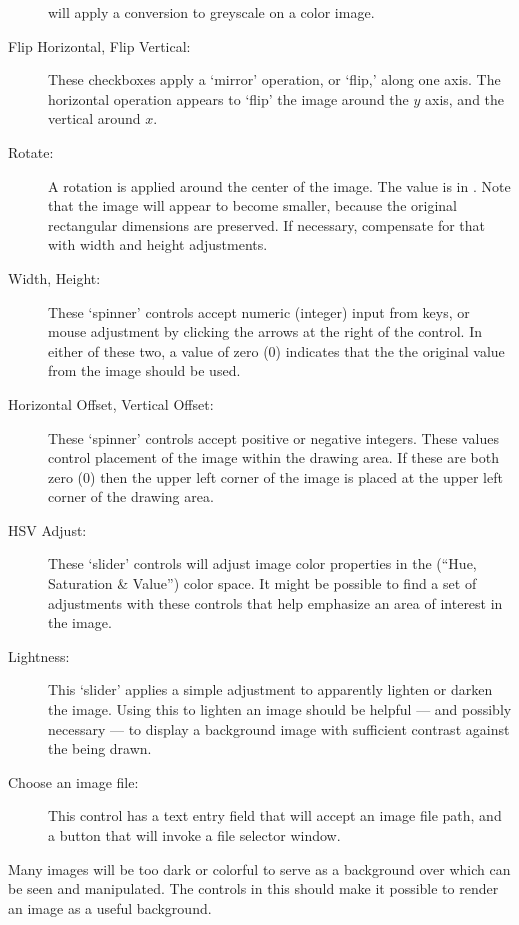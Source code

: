 \begin{description}
		  will apply a conversion to greyscale on a color
		  image.
		  \item[Flip Horizontal, Flip Vertical:] These checkboxes
		  apply a `mirror' operation, or `flip,' along one
		  axis. The horizontal operation appears to `flip'
		  the image around the $y$ axis,
		  and the vertical around $x$.
		  \item[Rotate:] A rotation is applied around the
		  center of the image. The value is in .
		  Note that the image will appear to become smaller,
		  because the original rectangular dimensions
		  are preserved. If necessary, compensate for that
		  with width and height adjustments.
		  \item[Width, Height:] These `spinner' controls accept
		  numeric (integer) input from keys, or mouse adjustment
		  by clicking the arrows at the right of the control.
		  In either of these two, a value of zero (0)
		  indicates that the the original value from the image
		  should be used.
		  \item[Horizontal Offset, Vertical Offset:] These
		  `spinner' controls accept positive or negative
		  integers. These values control placement of the image
		  within the drawing area. If these are both
		  zero (0) then the upper left corner of the image
		  is placed at the upper left corner of the drawing
		  area.
		  \item[HSV Adjust:] These `slider' controls will
		  adjust image color properties in the
		  (``Hue, Saturation \& Value'') color space.
		  It might be possible to find a set of adjustments
		  with these controls that help emphasize an area
		  of interest in the image.
		  \item[Lightness:] This `slider' applies a simple
		  adjustment to apparently lighten or darken the
		  image. Using this to lighten an image should be
		  helpful --- and possibly necessary --- to display
		  a background image with sufficient contrast
		  against the  being drawn.
		  \item[Choose an image file:] This control has a
		  text entry field that will accept an image
		  file path, and a button that will invoke a
		  file selector  window.
		\end{description}

		Many images will be too dark or colorful to serve
		as a background over which  can be
		seen and manipulated. The controls in this 
		should make it possible to render an image as a
		useful background.
